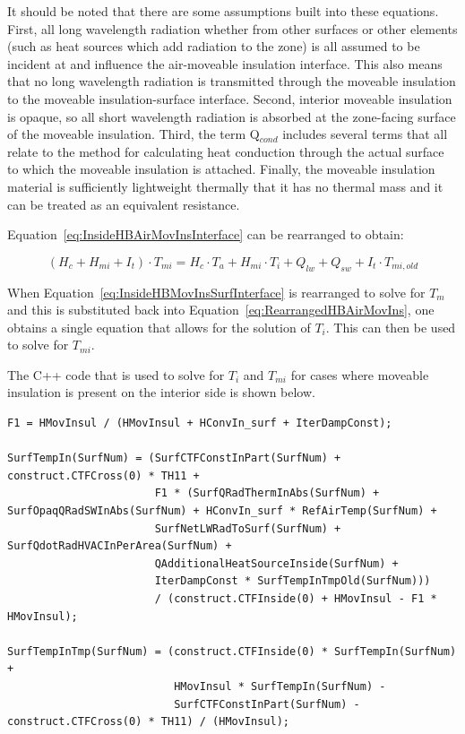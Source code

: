 It should be noted that there are some assumptions built into these equations.  First, all long wavelength radiation whether from other surfaces or other elements (such as heat sources which add radiation to the zone) is all assumed to be incident at and influence the air-moveable insulation interface.  This also means that no long wavelength radiation is transmitted through the moveable insulation to the moveable insulation-surface interface.  Second, interior moveable insulation is opaque, so all short wavelength radiation is absorbed at the zone-facing surface of the moveable insulation.  Third, the term Q\(_{cond}\) includes several terms that all relate to the method for calculating heat conduction through the actual surface to which the moveable insulation is attached.  Finally, the moveable insulation material is sufficiently lightweight thermally that it has no thermal mass and it can be treated as an equivalent resistance.

Equation~\ref{eq:InsideHBAirMovInsInterface} can be rearranged to obtain:

\begin{equation}
\left( H_c + H_{mi} + I_t \right) \cdot T_{mi} = H_c \cdot T_a + H_{mi} \cdot T_i + Q_{lw} + Q_{sw} + I_t \cdot T_{mi,old}
\label{eq:RearrangedHBAirMovIns}
\end{equation}

When Equation~\ref{eq:InsideHBMovInsSurfInterface} is rearranged to solve for \(T_m\) and this is substituted back into Equation~\ref{eq:RearrangedHBAirMovIns}, one obtains a single equation that allows for the solution of \(T_i\).  This can then be used to solve for \(T_{mi}\).

The C++ code that is used to solve for \(T_i\) and \(T_{mi}\) for cases where moveable insulation is present on the interior side is shown below.

\begin{lstlisting}
F1 = HMovInsul / (HMovInsul + HConvIn_surf + IterDampConst);

SurfTempIn(SurfNum) = (SurfCTFConstInPart(SurfNum) + construct.CTFCross(0) * TH11 +
                       F1 * (SurfQRadThermInAbs(SurfNum) + SurfOpaqQRadSWInAbs(SurfNum) + HConvIn_surf * RefAirTemp(SurfNum) +
                       SurfNetLWRadToSurf(SurfNum) + SurfQdotRadHVACInPerArea(SurfNum) +
                       QAdditionalHeatSourceInside(SurfNum) +
                       IterDampConst * SurfTempInTmpOld(SurfNum)))
                       / (construct.CTFInside(0) + HMovInsul - F1 * HMovInsul);

SurfTempInTmp(SurfNum) = (construct.CTFInside(0) * SurfTempIn(SurfNum) +
                          HMovInsul * SurfTempIn(SurfNum) -
                          SurfCTFConstInPart(SurfNum) - construct.CTFCross(0) * TH11) / (HMovInsul);
\end{lstlisting}

